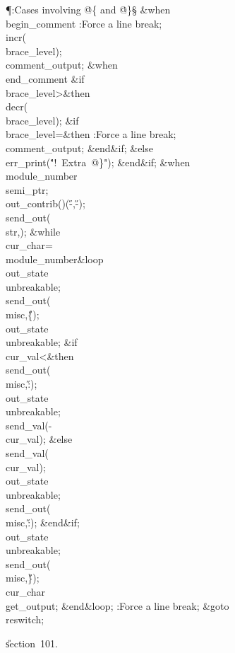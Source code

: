\Y\P\?\4:Cases involving \.{@\{} and \.{@\}}\X\S\?\6
\4\&{when}\8\\{begin\_comment}\KR\6
:Force a line break\X;\6
\\{incr}\?\1(\?\\{brace\_level}\?\2)\?;\5
\\{comment\_output}\?\K\?;\6
\4\&{when}\8\\{end\_comment}\KR\6
\&{if}\1\1\8\\{brace\_level}\?>\2\8\&{then}\6
\\{decr}\?\1(\?\\{brace\_level}\?\2)\?;\6
\&{if}\1\1\8\\{brace\_level}\?=\2\8\&{then}\6
:Force a line break\X;\6
\\{comment\_output}\?\K\?;\2\6
\&{end}\8\2\&{if}\1;\6
\4\&{else}\6
\\{err\_print}\?\1(\?\.{"!\ Extra\ @\}"}\?\2)\?;\2\6
\&{end}\8\2\&{if}\1;\6
\4\&{when}\8\\{module\_number}\KR\6
\\{semi\_ptr}\?\K{};\5
\\{out\_contrib}\?\1(\?\to{}\?\2)\K\1(\?\H{-}\?,\?\H{-}\?\2)\?;\5
\\{send\_out}\?\1(\?\\{str}\?,\?\2)\?;\6
\1\&{while}\8\\{cur\_char}\?=\?\\{module\_number}\8\&{loop}\6
\\{out\_state}\?\K\?\\{unbreakable};\5
\\{send\_out}\?\1(\?\\{misc}\?,\?\H{\{}\?\2)\?;\5
\\{out\_state}\?\K\?\\{unbreakable};\6
\&{if}\1\1\8\\{cur\_val}\?<\2\8\&{then}\6
\\{send\_out}\?\1(\?\\{misc}\?,\?\H{:}\?\2)\?;\5
\\{out\_state}\?\K\?\\{unbreakable};\5
\\{send\_val}\?\1(-\?\\{cur\_val}\?\2)\?;\6
\4\&{else}\6
\\{send\_val}\?\1(\?\\{cur\_val}\?\2)\?;\5
\\{out\_state}\?\K\?\\{unbreakable};\5
\\{send\_out}\?\1(\?\\{misc}\?,\?\H{:}\?\2)\?;\2\6
\&{end}\8\2\&{if}\1;\6
\\{out\_state}\?\K\?\\{unbreakable};\5
\\{send\_out}\?\1(\?\\{misc}\?,\?\H{\}}\?\2)\?;\5
\\{cur\_char}\?\K\?\\{get\_output};\2\6
\&{end}\8\&{loop};\6
:Force a line break\X;\6
\&{goto}\8\\{reswitch};\par
\U section~101.\fi

